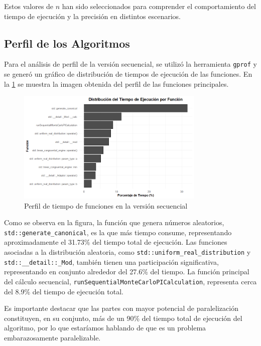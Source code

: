 \documentclass[a4paper, 10pt, onecolumn]{IEEEtran}
\begin{document}
Estos valores de $n$ han sido seleccionados para comprender el comportamiento del tiempo de ejecución y la precisión en distintos escenarios.

\subsection{Perfil de los Algoritmos}
Para el análisis de perfil de la versión secuencial, se utilizó la herramienta \texttt{gprof} \cite{gprof} y se generó un gráfico de distribución de tiempos de ejecución de las funciones. En la \cref{fig:sec_profile} se muestra la imagen obtenida del perfil de las funciones principales.

\begin{figure}[H]
  \centering
  \includegraphics[width=0.8\textwidth]{./img/secuencial_profiling.png}
  \caption{Perfil de tiempo de funciones en la versión secuencial}
  \label{fig:sec_profile}
\end{figure}

Como se observa en la figura, la función que genera números aleatorios, \texttt{std::generate\_canonical}, es la que más tiempo consume, representando aproximadamente el 31.73\% del tiempo total de ejecución. Las funciones asociadas a la distribución aleatoria, como \texttt{std::uniform\_real\_distribution} y \texttt{std::\_\_detail::\_Mod}, también tienen una participación significativa, representando en conjunto alrededor del 27.6\% del tiempo. La función principal del cálculo secuencial, \texttt{runSequentialMonteCarloPICalculation}, representa cerca del 8.9\% del tiempo de ejecución total.

Es importante destacar que las partes con mayor potencial de paralelización constituyen, en su conjunto, más de un 90\% del tiempo total de ejecución del algoritmo, por lo que estaríamos hablando de que es un problema embarazosamente paralelizable.
\end{document}
